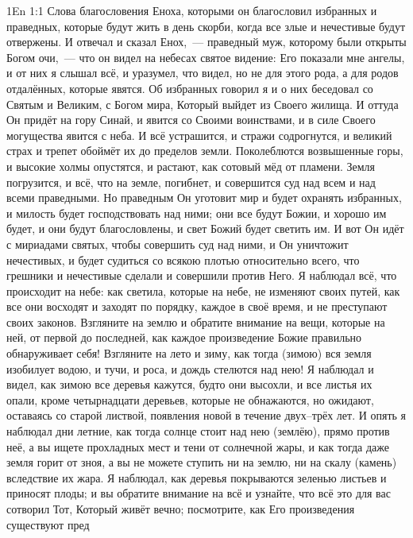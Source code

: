 \vs 1En 1:1
Слова благословения Еноха, которыми он благословил избранных и
праведных, которые будут жить в день скорби, когда все злые и нечестивые
будут отвержены.
И отвечал и сказал Енох,~--- праведный муж, которому были открыты
Богом очи,~--- что он видел на небесах святое видение: Его показали мне
ангелы, и от них я слышал всё, и уразумел, что видел, но не для этого рода,
а для родов отдалённых, которые явятся.
Об избранных говорил я и о них беседовал со Святым и Великим, с
Богом мира, Который выйдет из Своего жилища.
И оттуда Он придёт на гору Синай, и явится со Своими воинствами, и в
силе Своего могущества явится с неба.
И всё устрашится, и стражи содрогнутся, и великий страх и трепет
обоймёт их до пределов земли.
Поколеблются возвышенные горы, и высокие холмы опустятся, и растают,
как сотовый мёд от пламени.
Земля погрузится, и всё, что на земле, погибнет, и совершится суд
над всем и над всеми праведными.
Но праведным Он уготовит мир и будет охранять избранных, и милость
будет господствовать над ними; они все будут Божии, и хорошо им будет, и они
будут благословлены, и свет Божий будет светить им.
И вот Он идёт с мириадами святых,  чтобы совершить суд над ними,  и
Он уничтожит нечестивых, и будет судиться со всякою плотью относительно
всего, что грешники и нечестивые сделали и совершили против Него.
Я наблюдал всё, что происходит на небе: как светила, которые на
небе, не изменяют своих путей, как все они восходят и заходят по порядку,
каждое в своё время, и не преступают своих законов.
Взгляните на землю и обратите внимание на вещи, которые на ней, от
первой до последней, как каждое произведение Божие правильно обнаруживает
себя!
Взгляните на лето и зиму, как тогда (зимою) вся земля изобилует
водою, и тучи, и роса, и дождь стелются над нею!
Я наблюдал и видел, как зимою все деревья кажутся, будто они
высохли, и все листья их опали, кроме четырнадцати деревьев, которые не
обнажаются, но ожидают, оставаясь со старой листвой, появления новой в
течение двух--трёх лет.
И опять я наблюдал дни летние, как тогда солнце стоит над нею
(землёю), прямо против неё, а вы ищете прохладных мест и тени от солнечной
жары, и как тогда даже земля горит от зноя, а вы не можете ступить ни на
землю, ни на скалу (камень) вследствие их жара.
Я наблюдал, как деревья покрываются зеленью листьев и приносят
плоды; и вы обратите внимание на всё и узнайте, что всё это для вас сотворил
Тот, Который живёт вечно; посмотрите, как Его произведения существуют пред
